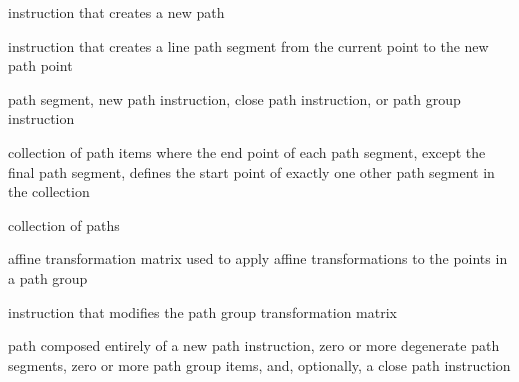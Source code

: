 %
 instruction that creates a new path

%
 instruction that creates a line path segment from the current point to the new path point

%
path segment, new path instruction, close path instruction, or path group instruction

%
collection of path items where the end point of each path segment, except the final path segment, defines the start point of exactly one other path segment in the collection

%
collection of paths

%
affine transformation matrix used to apply affine transformations to the points in a path group

%
instruction that modifies the path group transformation matrix

%
path composed entirely of a new path instruction, zero or more degenerate path segments, zero or more path group items, and, optionally, a close path instruction



%
%

